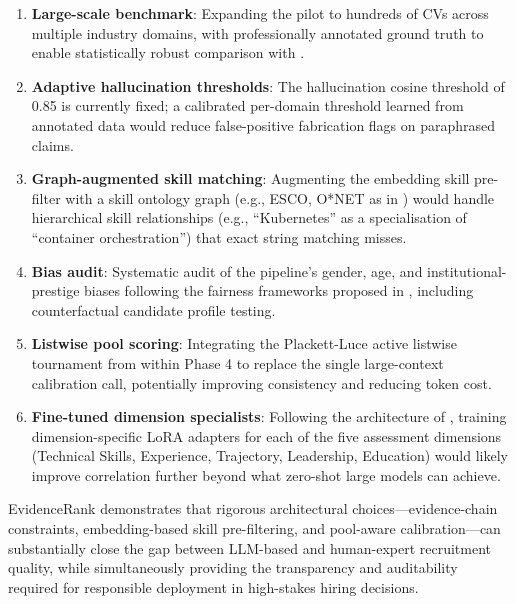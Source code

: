 \documentclass[journal]{IEEEtran}
\begin{document}
\begin{enumerate}
  \item \textbf{Large-scale benchmark}: Expanding the pilot to hundreds of CVs
        across multiple industry domains, with professionally annotated ground
        truth to enable statistically robust comparison with \cite{chowdhury2026}.

  \item \textbf{Adaptive hallucination thresholds}: The hallucination cosine
        threshold of 0.85 is currently fixed; a calibrated per-domain threshold
        learned from annotated data would reduce false-positive fabrication flags
        on paraphrased claims.

  \item \textbf{Graph-augmented skill matching}: Augmenting the embedding skill
        pre-filter with a skill ontology graph (e.g., ESCO, O*NET as in
        \cite{alonso2025}) would handle hierarchical skill relationships
        (e.g., ``Kubernetes'' as a specialisation of ``container orchestration'')
        that exact string matching misses.

  \item \textbf{Bias audit}: Systematic audit of the pipeline's gender, age, and
        institutional-prestige biases following the fairness frameworks proposed
        in \cite{frazzetto2026}, including counterfactual candidate profile testing.

  \item \textbf{Listwise pool scoring}: Integrating the Plackett-Luce active
        listwise tournament from \cite{yuksel2026} within Phase 4 to replace the
        single large-context calibration call, potentially improving consistency
        and reducing token cost.

  \item \textbf{Fine-tuned dimension specialists}: Following the architecture of
        \cite{chowdhury2026}, training dimension-specific LoRA adapters for each
        of the five assessment dimensions (Technical Skills, Experience,
        Trajectory, Leadership, Education) would likely improve correlation
        further beyond what zero-shot large models can achieve.
\end{enumerate}

EvidenceRank demonstrates that rigorous architectural choices—evidence-chain
constraints, embedding-based skill pre-filtering, and pool-aware calibration—can
substantially close the gap between LLM-based and human-expert recruitment
quality, while simultaneously providing the transparency and auditability required
for responsible deployment in high-stakes hiring decisions.
\end{document}

